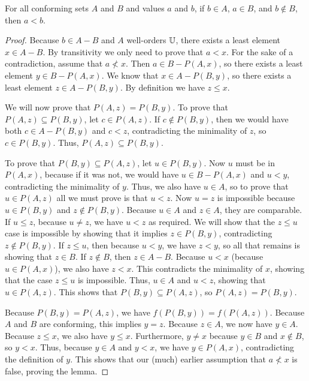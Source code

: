 \documentclass[../math.tex]{subfiles}
\begin{document}
\begin{lemma} \label{zorn-initial1}
    For all conforming sets $A$ and $B$ and values $a$ and $b$, if $b \in A$, $a
    \in B$, and $b \notin B$, then $a < b$.
\end{lemma}
\begin{proof}
    Because $b \in A - B$ and $A$ well-orders $\mathbb{U}$, there exists a least element
    $x \in A - B$.  By transitivity we only need to prove that $a < x$.  For the
    sake of a contradiction, assume that $a \nless x$.  Then $a \in B - P(A,
    x)$, so there exists a least element $y \in B - P(A, x)$.  We know that $x
    \in A - P(B, y)$, so there exists a least element $z \in A - P(B, y)$.  By
    definition we have $z \leq x$.

    We will now prove that $P(A, z) = P(B, y)$.  To prove that $P(A, z)
    \subseteq P(B, y)$, let $c \in P(A, z)$.  If $c \notin P(B, y)$, then we
    would have both $c \in A - P(B, y)$ and $c < z$, contradicting the
    minimality of $z$, so $c \in P(B, y)$.  Thus, $P(A, z) \subseteq P(B, y)$.

    To prove that $P(B, y) \subseteq P(A, z)$, let $u \in P(B, y)$.  Now $u$
    must be in $P(A, x)$, because if it was not, we would have $u \in B - P(A,
    x)$ and $u < y$, contradicting the minimality of $y$.  Thus, we also have $u
    \in A$, so to prove that $u \in P(A, z)$ all we must prove is that $u < z$.
    Now $u = z$ is impossible because $u \in P(B, y)$ and $z \notin P(B, y)$.
    Because $u \in A$ and $z \in A$, they are comparable.  If $u \leq z$,
    because $u \neq z$, we have $u < z$ as required.  We will show that the $z
    \leq u$ case is impossible by showing that it implies $z \in P(B, y)$,
    contradicting $z \notin P(B, y)$.  If $z \leq u$, then because $u < y$, we
    have $z < y$, so all that remains is showing that $z \in B$.  If $z \notin
    B$, then $z \in A - B$.  Because $u < x$ (because $u \in P(A, x)$), we also
    have $z < x$.  This contradicts the minimality of $x$, showing that the case
    $z \leq u$ is impossible.  Thus, $u \in A$ and $u < z$, showing that $u \in
    P(A, z)$.  This shows that $P(B, y) \subseteq P(A, z)$, so $P(A, z) = P(B,
    y)$.

    Because $P(B, y) = P(A, z)$, we have $f(P(B, y)) = f(P(A, z))$.  Because $A$
    and $B$ are conforming, this implies $y = z$.  Because $z \in A$, we now
    have $y \in A$.  Because $z \leq x$, we also have $y \leq x$.  Furthermore,
    $y \neq x$ because $y \in B$ and $x \notin B$, so $y < x$.  Thus, because $y
    \in A$ and $y < x$, we have $y \in P(A, x)$, contradicting the definition of
    $y$.  This shows that our (much) earlier assumption that $a \nless x$ is
    false, proving the lemma.
\end{proof}
\end{document}
